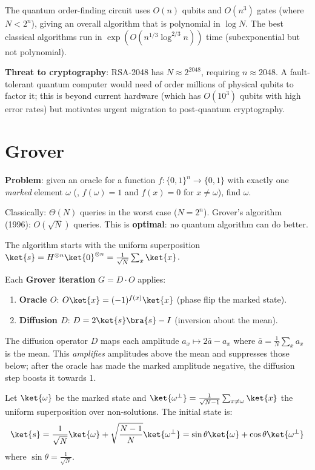 \documentclass[oneside]{academica}
\begin{document}
The quantum order-finding circuit uses $O(n)$ qubits and $O(n^3)$ gates (where $N<2^n$), giving an overall algorithm that is polynomial in $\log N$.
The best classical algorithms run in $\exp(O(n^{1/3}\log^{2/3}n))$ time (subexponential but not polynomial).

\begin{note}
  \textbf{Threat to cryptography}: RSA-2048 has $N\approx2^{2048}$, requiring $n\approx2048$.
  A fault-tolerant quantum computer would need of order millions of physical qubits to factor it; this is beyond current hardware (which has $O(10^3)$ qubits with high error rates) but motivates urgent migration to post-quantum cryptography.
\end{note}

\section{Grover}

\textbf{Problem}: given an oracle for a function $f:\{0,1\}^n\to\{0,1\}$ with exactly one \emph{marked} element $\omega$ (\ie, $f(\omega)=1$ and $f(x)=0$ for $x\neq\omega$), find $\omega$.

Classically: $\Theta(N)$ queries in the worst case ($N=2^n$).
Grover's algorithm (1996): $O(\sqrt{N})$ queries.
This is \textbf{optimal}: no quantum algorithm can do better.

The algorithm starts with the uniform superposition $\ket{s}=H^{\otimes n}\ket{0}^{\otimes n}=\frac{1}{\sqrt{N}}\sum_x\ket{x}$.

Each \textbf{Grover iteration} $G=D\cdot O$ applies:
\begin{enumerate}
  \item \textbf{Oracle $O$}: $O\ket{x}=(-1)^{f(x)}\ket{x}$ (phase
    flip the marked state).
  \item \textbf{Diffusion $D$}: $D=2\ket{s}\bra{s}-I$ (inversion
    about the mean).
\end{enumerate}

The diffusion operator $D$ maps each amplitude $a_x\mapsto2\bar a-a_x$ where $\bar a=\frac{1}{N}\sum_x a_x$ is the mean.
This \emph{amplifies} amplitudes above the mean and suppresses those below; after the oracle has made the marked amplitude negative, the diffusion step boosts it towards 1.

Let $\ket{\omega}$ be the marked state and $\ket{\omega^\perp}=\frac{1}{\sqrt{N-1}}\sum_{x\neq\omega}\ket{x}$ the uniform superposition over non-solutions.
The initial state is:
\begin{equation*}
  \ket{s}=\frac{1}{\sqrt{N}}\ket{\omega}+\sqrt{\frac{N-1}{N}}\ket{\omega^\perp}=\sin\theta\ket{\omega}+\cos\theta\ket{\omega^\perp}
\end{equation*}
where $\sin\theta=\frac{1}{\sqrt{N}}$.
\end{document}
